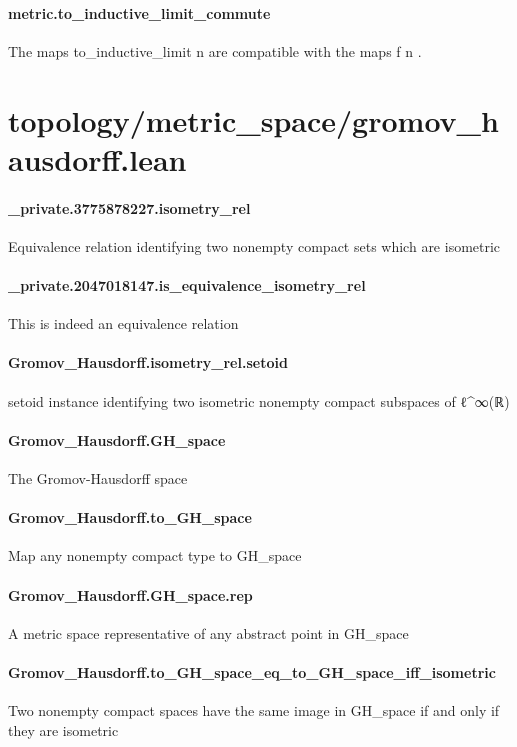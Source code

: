 \documentclass{article}
\begin{document}
\paragraph{metric.to\_inductive\_limit\_commute}
\par
The maps 
\colorbox[RGB]{253,246,227}{{{{\color[RGB]{101, 123, 131} to\_inductive\_limit n }}}} are compatible with the maps 
\colorbox[RGB]{253,246,227}{{{{\color[RGB]{101, 123, 131} f n }}}}.
\section{topology/metric\_space/gromov\_hausdorff.lean}\paragraph{\_private.3775878227.isometry\_rel}
\par
Equivalence relation identifying two nonempty compact sets which are isometric
\paragraph{\_private.2047018147.is\_equivalence\_isometry\_rel}
\par
This is indeed an equivalence relation
\paragraph{Gromov\_Hausdorff.isometry\_rel.setoid}
\par
setoid instance identifying two isometric nonempty compact subspaces of ℓ\textasciicircum{}∞(ℝ)
\paragraph{Gromov\_Hausdorff.GH\_space}
\par
The Gromov-Hausdorff space
\paragraph{Gromov\_Hausdorff.to\_GH\_space}
\par
Map any nonempty compact type to GH\_space
\paragraph{Gromov\_Hausdorff.GH\_space.rep}
\par
A metric space representative of any abstract point in GH\_space
\paragraph{Gromov\_Hausdorff.to\_GH\_space\_eq\_to\_GH\_space\_iff\_isometric}
\par
Two nonempty compact spaces have the same image in GH\_space if and only if they are isometric
\end{document}
